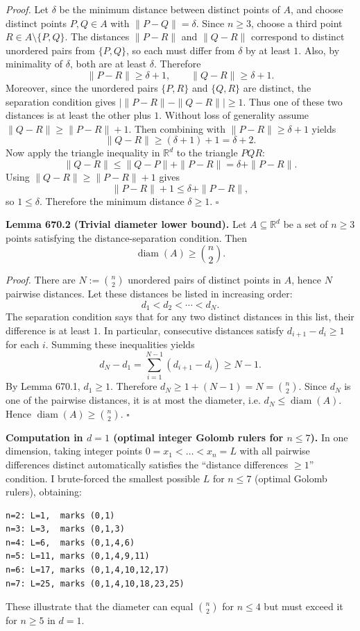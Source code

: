 \noindent\emph{Proof.}
Let $\delta$ be the minimum distance between distinct points of $A$, and choose distinct points $P,Q\in A$ with $\|P-Q\|=\delta$.
Since $n\ge 3$, choose a third point $R\in A\setminus\{P,Q\}$.
The distances $\|P-R\|$ and $\|Q-R\|$ correspond to distinct unordered pairs from $\{P,Q\}$, so each must differ from $\delta$ by at least $1$.
Also, by minimality of $\delta$, both are at least $\delta$.
Therefore
\[
\|P-R\|\ge \delta+1,\qquad \|Q-R\|\ge \delta+1.
\]
Moreover, since the unordered pairs $\{P,R\}$ and $\{Q,R\}$ are distinct, the separation condition gives
\(|\|P-R\|-\|Q-R\||\ge 1\).
Thus one of these two distances is at least the other plus $1$.
Without loss of generality assume $\|Q-R\|\ge \|P-R\|+1$.
Then combining with $\|P-R\|\ge \delta+1$ yields
\[\|Q-R\|\ge (\delta+1)+1 = \delta+2.
\]
Now apply the triangle inequality in $\mathbb{R}^d$ to the triangle $PQR$:
\[
\|Q-R\| \le \|Q-P\| + \|P-R\| = \delta + \|P-R\|.
\]
Using $\|Q-R\|\ge \|P-R\|+1$ gives
\[
\|P-R\|+1 \le \delta + \|P-R\|,
\]
so $1\le \delta$.
Therefore the minimum distance $\delta\ge 1$.
\hfill$\square$

\medskip
\noindent\textbf{Lemma 670.2 (Trivial diameter lower bound).}
Let $A\subseteq\mathbb{R}^d$ be a set of $n\ge 3$ points satisfying the distance-separation condition.
Then
\[
\operatorname{diam}(A)\ge \binom{n}{2}.
\]

\noindent\emph{Proof.}
There are $N:=\binom{n}{2}$ unordered pairs of distinct points in $A$, hence $N$ pairwise distances.
Let these distances be listed in increasing order:
\[d_1<d_2<\cdots<d_N.
\]
The separation condition says that for any two distinct distances in this list, their difference is at least $1$.
In particular, consecutive distances satisfy $d_{i+1}-d_i\ge 1$ for each $i$.
Summing these inequalities yields
\[
 d_N - d_1 = \sum_{i=1}^{N-1} (d_{i+1}-d_i) \ge N-1.
\]
By Lemma 670.1, $d_1\ge 1$.
Therefore $d_N\ge 1+(N-1)=N=\binom n2$.
Since $d_N$ is one of the pairwise distances, it is at most the diameter, i.e. $d_N\le \operatorname{diam}(A)$.
Hence $\operatorname{diam}(A)\ge \binom n2$.
\hfill$\square$

\medskip
\noindent\textbf{Computation in $d=1$ (optimal integer Golomb rulers for $n\le 7$).}
In one dimension, taking integer points $0=x_1<\dots<x_n=L$ with all pairwise differences distinct automatically satisfies the ``distance differences $\ge 1$'' condition.
I brute-forced the smallest possible $L$ for $n\le 7$ (optimal Golomb rulers), obtaining:
\begin{verbatim}
n=2: L=1,  marks (0,1)
n=3: L=3,  marks (0,1,3)
n=4: L=6,  marks (0,1,4,6)
n=5: L=11, marks (0,1,4,9,11)
n=6: L=17, marks (0,1,4,10,12,17)
n=7: L=25, marks (0,1,4,10,18,23,25)
\end{verbatim}
These illustrate that the diameter can equal $\binom n2$ for $n\le 4$ but must exceed it for $n\ge 5$ in $d=1$.


